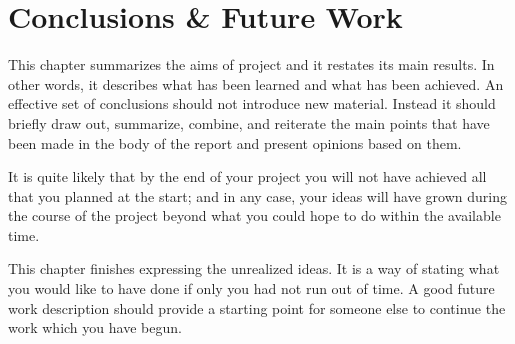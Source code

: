 
\chapter{Conclusions \& Future Work}\label{ch:conclusion}

This chapter summarizes the aims of project and it restates its main results. In other words, it describes what has been learned and what has been achieved. An effective set of conclusions should not introduce new material. Instead it should briefly draw out, summarize, combine, and reiterate the main points that have been made in the body of the report and present opinions based on them.

It is quite likely that by the end of your project you will not have
achieved all that you planned at the start; and in any case, your ideas
will have grown during the course of the project beyond what you could
hope to do within the available time.

This chapter finishes expressing the unrealized ideas. It is a way of stating what you would like to have done if only you had not run out of time. A good future work description should provide a starting point for someone else to continue the work which you have begun.